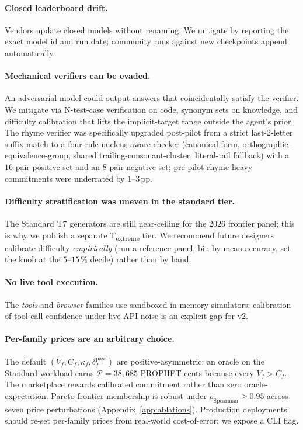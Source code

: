 \paragraph{Closed leaderboard drift.} Vendors update closed models
without renaming. We mitigate by reporting the exact model id and run
date; community runs against new checkpoints append automatically.

\paragraph{Mechanical verifiers can be evaded.}
An adversarial model could output answers that coincidentally satisfy
the verifier. We mitigate via N-test-case verification on code,
synonym sets on knowledge, and difficulty calibration that lifts
the implicit-target range outside the agent's prior. The rhyme
verifier was specifically upgraded post-pilot from a strict
last-2-letter suffix match to a four-rule nucleus-aware checker
(canonical-form, orthographic-equivalence-group, shared
trailing-consonant-cluster, literal-tail fallback) with a $16$-pair
positive set and an $8$-pair negative set; pre-pilot rhyme-heavy
commitments were underrated by $1$--$3$\,pp.

\paragraph{Difficulty stratification was uneven in the standard tier.}
The Standard T7 generators are still near-ceiling for the 2026
frontier panel; this is why we publish a separate
T\textsubscript{extreme} tier. We recommend future designers calibrate
difficulty \emph{empirically} (run a reference panel, bin by mean
accuracy, set the knob at the $5$--$15\,\%$ decile) rather than by hand.

\paragraph{No live tool execution.} The \emph{tools} and \emph{browser}
families use sandboxed in-memory simulators; calibration of tool-call
confidence under live API noise is an explicit gap for v2.

\paragraph{Per-family prices are an arbitrary choice.}
The default $(V_f, C_f, \kappa_f, \delta^{\mathrm{pass}}_f)$ are
positive-asymmetric: an oracle on the Standard workload earns
$\mathcal{P} = 38{,}685$ PROPHET-cents because every $V_f > C_f$. The
marketplace rewards calibrated commitment rather than zero
oracle-expectation. Pareto-frontier membership is robust under
$\rho_{\text{Spearman}} \ge 0.95$ across seven price perturbations
(Appendix~\ref{app:ablations}). Production deployments should re-set
per-family prices from real-world cost-of-error; we expose a CLI flag.
